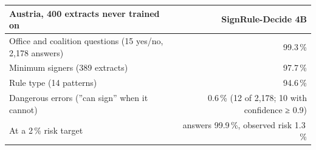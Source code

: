 \begin{tabular}{lr}
\toprule
Austria, 400 extracts never trained on & SignRule-Decide 4B \\
\midrule
Office and coalition questions (15 yes/no, 2,178 answers) & 99.3\,\% \\
Minimum signers (389 extracts) & 97.7\,\% \\
Rule type (14 patterns) & 94.6\,\% \\
Dangerous errors (''can sign'' when it cannot) & 0.6\,\% (12 of 2,178; 10 with confidence ≥ 0.9) \\
At a 2\,\% risk target & answers 99.9\,\%, observed risk 1.3\,\% \\
\bottomrule
\end{tabular}
